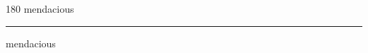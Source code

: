
\begin{frame}
\begin{center}
\begin{turn}{180}
{\fontsize{2.5cm}{1em}\selectfont mendacious}
\end{turn}
\vspace{1em}\par  
\hrule
\vspace{1em}\par  
{\fontsize{2.5cm}{1em}\selectfont mendacious}
\end{center}
\end{frame}
